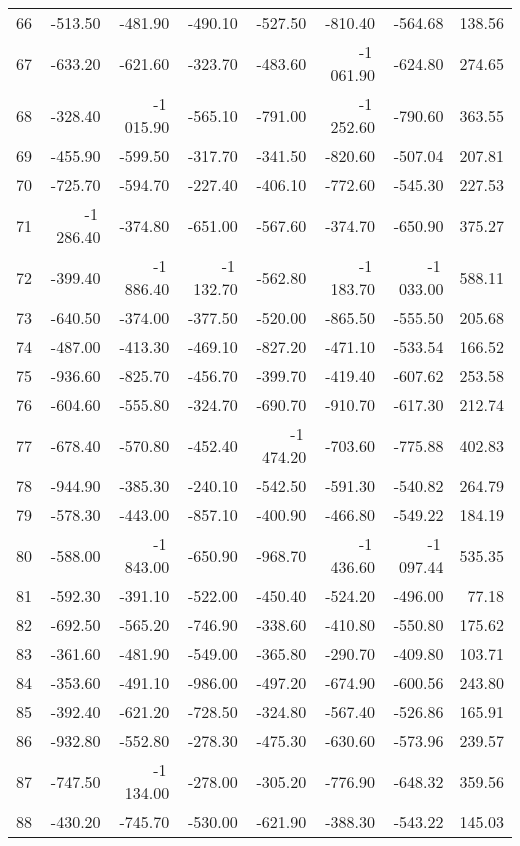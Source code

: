 \begin{longtable}{rrrrrrrr}
66 & -513.50 & -481.90 & -490.10 & -527.50 & -810.40 & -564.68 & 138.56  \\
67 & -633.20 & -621.60 & -323.70 & -483.60 & -1\,061.90 & -624.80 & 274.65  \\
68 & -328.40 & -1\,015.90 & -565.10 & -791.00 & -1\,252.60 & -790.60 & 363.55  \\
69 & -455.90 & -599.50 & -317.70 & -341.50 & -820.60 & -507.04 & 207.81  \\
70 & -725.70 & -594.70 & -227.40 & -406.10 & -772.60 & -545.30 & 227.53  \\
71 & -1\,286.40 & -374.80 & -651.00 & -567.60 & -374.70 & -650.90 & 375.27  \\
72 & -399.40 & -1\,886.40 & -1\,132.70 & -562.80 & -1\,183.70 & -1\,033.00 & 588.11  \\
73 & -640.50 & -374.00 & -377.50 & -520.00 & -865.50 & -555.50 & 205.68  \\
74 & -487.00 & -413.30 & -469.10 & -827.20 & -471.10 & -533.54 & 166.52  \\
75 & -936.60 & -825.70 & -456.70 & -399.70 & -419.40 & -607.62 & 253.58  \\
76 & -604.60 & -555.80 & -324.70 & -690.70 & -910.70 & -617.30 & 212.74  \\
77 & -678.40 & -570.80 & -452.40 & -1\,474.20 & -703.60 & -775.88 & 402.83  \\
78 & -944.90 & -385.30 & -240.10 & -542.50 & -591.30 & -540.82 & 264.79  \\
79 & -578.30 & -443.00 & -857.10 & -400.90 & -466.80 & -549.22 & 184.19  \\
80 & -588.00 & -1\,843.00 & -650.90 & -968.70 & -1\,436.60 & -1\,097.44 & 535.35  \\
81 & -592.30 & -391.10 & -522.00 & -450.40 & -524.20 & -496.00 & 77.18  \\
82 & -692.50 & -565.20 & -746.90 & -338.60 & -410.80 & -550.80 & 175.62  \\
83 & -361.60 & -481.90 & -549.00 & -365.80 & -290.70 & -409.80 & 103.71  \\
84 & -353.60 & -491.10 & -986.00 & -497.20 & -674.90 & -600.56 & 243.80  \\
85 & -392.40 & -621.20 & -728.50 & -324.80 & -567.40 & -526.86 & 165.91  \\
86 & -932.80 & -552.80 & -278.30 & -475.30 & -630.60 & -573.96 & 239.57  \\
87 & -747.50 & -1\,134.00 & -278.00 & -305.20 & -776.90 & -648.32 & 359.56  \\
88 & -430.20 & -745.70 & -530.00 & -621.90 & -388.30 & -543.22 & 145.03  \\

\end{longtable}
